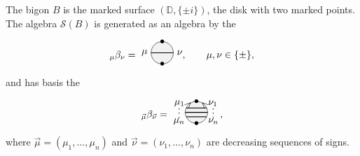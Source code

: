\documentclass[11pt]{article}
\numberwithin{equation}{section}
\numberwithin{equation}{section}
\begin{document}
\begin{Example}
The bigon $B$ is the marked surface $(\mathbb{D},\{\pm i\})$, the disk with two marked points. The algebra $\mathscr{S}(B)$ is generated as an algebra by the
\[
{}_\mu\beta_\nu = \begin{tikzpicture}[scale = 0.8, baseline = -5pt]
\fill [gray!10] (0,0) circle (0.5);
\draw (0,0) circle (0.5);
\node at (0,-0.5){\small $\bullet$};
\node at (0,0.5){\small $\bullet$};
\draw [thick] (-0.5,0) node[left]{$\mu$} -- (0.5,0) node[right]{$\nu$};
\end{tikzpicture}\!\!, \qquad
\mu,\nu \in \{\pm\},
\]
and has basis the
\[_{\vec{\mu}}\beta_{\vec{\nu}} = \begin{tikzpicture}[scale = 0.8, baseline = -5pt]
\fill [gray!10] (0,0) circle (0.5);
\draw (0,0) circle (0.5);
\node[rotate = 45] at (135:0.5) {\small $>$};
\node[rotate = -45] at (45:0.5) {\small $<$};
\node at (0,-0.5){\small $\bullet$};
\node at (0,0.5){\small $\bullet$};
\draw [thick] (-0.5,0) node[rotate = 90, above]{\footnotesize $\cdots$} -- (0.5,0) node[rotate = 90, below]{\footnotesize $\cdots$};
\draw [thick] (-0.45,-0.2) node[below left = -2pt]{\small $\mu_n$} -- (0.45,-0.2) node[below right = -2pt]{\small $\nu_n$};
\draw [thick] (-0.45,0.2) node[above left = -2pt]{\small $\mu_1$} -- (0.45,0.2) node[above right = -2pt]{\small $\nu_1$};
\end{tikzpicture}\!,
\]
where $\vec{\mu} = (\mu_1,\ldots,\mu_n)$ and $\vec{\nu} = (\nu_1,\ldots,\nu_n)$ are decreasing sequences of signs.


\end{Example}
\end{document}
